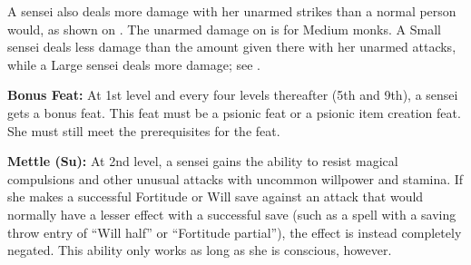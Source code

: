 {A sensei also deals more damage with her unarmed strikes than a normal person would, as shown on . The unarmed damage on  is for Medium monks. A Small sensei deals less damage than the amount given there with her unarmed attacks, while a Large sensei deals more damage; see .


\textbf{Bonus Feat:} At 1st level and every four levels thereafter (5th and 9th), a sensei gets a bonus feat. This feat must be a psionic feat or a psionic item creation feat. She must still meet the prerequisites for the feat.

\textbf{Mettle (Su):} At 2nd level, a sensei gains the ability to resist magical compulsions and other unusual attacks with uncommon willpower and stamina. If she makes a successful Fortitude or Will save against an attack that would normally have a lesser effect with a successful save (such as a spell with a saving throw entry of ``Will half'' or ``Fortitude partial''), the effect is instead completely negated. This ability only works as long as she is conscious, however.


}
